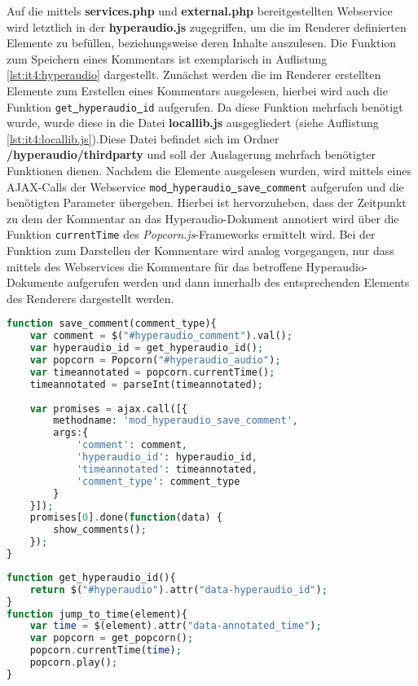 Auf die mittels \textbf{services.php} und \textbf{external.php} bereitgestellten Webservice wird letztlich in der \textbf{hyperaudio.js} zugegriffen, um die im Renderer definierten Elemente zu befüllen, beziehungsweise deren Inhalte auszulesen. Die Funktion zum Speichern eines Kommentars ist exemplarisch in Auflistung \ref{lst:it4:hyperaudio} dargestellt. Zunächst werden die im Renderer erstellten Elemente zum Erstellen eines Kommentars ausgelesen, hierbei wird auch die Funktion \texttt{get\underline{{ }}hyperaudio\underline{{ }}id} aufgerufen. Da diese Funktion mehrfach benötigt wurde, wurde diese in die Datei \textbf{locallib.js} ausgegliedert (siehe Auflistung \ref{lst:it4:locallib.js}).Diese Datei befindet sich im Ordner \textbf{/hyperaudio/thirdparty} und soll der Auslagerung mehrfach benötigter Funktionen dienen. Nachdem die Elemente ausgelesen wurden, wird mittels eines AJAX-Calls der Webservice \texttt{mod\underline{{ }}hyperaudio\underline{{ }}save\underline{{ }}comment} aufgerufen und die benötigten Parameter übergeben. Hierbei ist hervorzuheben, dass der Zeitpunkt zu dem der Kommentar an das Hyperaudio-Dokument annotiert wird über die Funktion \texttt{currentTime} des \textit{Popcorn.js}-Frameworks ermittelt wird. Bei der Funktion zum Darstellen der Kommentare wird analog vorgegangen, nur dass mittels des Webservices die Kommentare für das betroffene Hyperaudio-Dokumente aufgerufen werden und dann innerhalb des entsprechenden Elements des Renderers dargestellt werden.

\begin{lstlisting}[language=php,
             linewidth=\textwidth,
             caption={Ausschnitt der \textbf{hyperaudio.js} in der 4. Iteration},
             label={lst:it4:hyperaudio}]
function save_comment(comment_type){
    var comment = $("#hyperaudio_comment").val();
    var hyperaudio_id = get_hyperaudio_id();
    var popcorn = Popcorn("#hyperaudio_audio");
    var timeannotated = popcorn.currentTime();
    timeannotated = parseInt(timeannotated);
	    
    var promises = ajax.call([{
        methodname: 'mod_hyperaudio_save_comment',
        args:{
            'comment': comment,
            'hyperaudio_id': hyperaudio_id,       
            'timeannotated': timeannotated,
            'comment_type': comment_type
        }
    }]);
    promises[0].done(function(data) {
        show_comments();
    });
}
\end{lstlisting}

\begin{lstlisting}[language=php,
             linewidth=\textwidth,
             caption={Ausschnitt der \textbf{locallib.js} in der 4. Iteration},
             label={lst:it4:locallib.js}]
function get_hyperaudio_id(){
    return $("#hyperaudio").attr("data-hyperaudio_id");
}
function jump_to_time(element){
    var time = $(element).attr("data-annotated_time");
    var popcorn = get_popcorn();
    popcorn.currentTime(time);
    popcorn.play();
}
\end{lstlisting}


